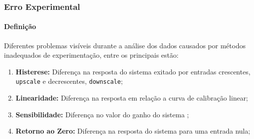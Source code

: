 \documentclass{article}
\begin{document}
        \subsubsection{Erro Experimental}
            \paragraph{Definição}Diferentes problemas visíveis durante a análise dos dados causados por métodos inadequados de experimentação, entre os principais estão:
                \begin{enumerate}[rightmargin = \leftmargin]
                    \item \textbf{Histerese:} Diferença na resposta do sistema exitado por entradas crescentes, \texttt{upscale} e decrescentes, \texttt{downscale};

                    \item \textbf{Linearidade:} Diferença na resposta em relação a curva de calibração linear;

                    \item \textbf{Sensibilidade:} Diferença no valor do ganho do sistema ;

                    \item \textbf{Retorno ao Zero:} Diferença na resposta do sistema para uma entrada nula;
                \end{enumerate}
\end{document}
